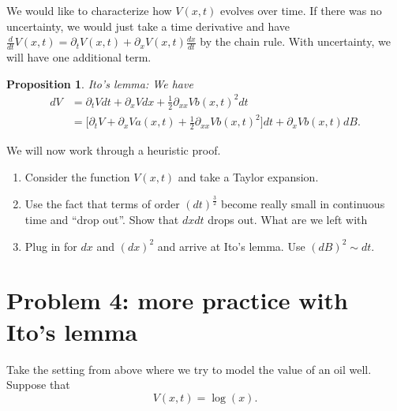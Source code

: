 \documentclass[11pt]{extarticle}
\theoremstyle{plain}
\newtheorem{prop}[thm]{Proposition}
\theoremstyle{definition}
\begin{document}
We would like to characterize how $V(x, t)$ evolves over time. If there was no uncertainty, we would just take a time derivative and have $\frac{d}{dt} V(x, t) = \partial_t V(x, t) + \partial_x V(x, t) \frac{dx}{dt}$ by the chain rule. With uncertainty, we will have one additional term. 

\begin{prop}
	Ito's lemma: We have 
	\begin{align*}
		dV &= \partial_t V dt + \partial_x V dx + \frac{1}{2} \partial_{xx} V b(x, t)^2 dt \\
		&= \bigg[ \partial_t V + \partial_x V a(x, t) + \frac{1}{2} \partial_{xx} V b(x, t)^2\bigg] dt + \partial_x V b(x, t) dB.
	\end{align*}
\end{prop}

\vspace{5mm}
\noindent
We will now work through a heuristic proof.
\begin{enumerate}
\item Consider the function $V(x, t)$ and take a Taylor expansion.

\item Use the fact that terms of order $(dt)^\frac{3}{2}$ become really small in continuous time and ``drop out''. Show that $dx dt$ drops out. What are we left with

\item Plug in for $dx$ and $(dx)^2$ and arrive at Ito's lemma. Use $(dB)^2 \sim dt$.

\end{enumerate}




\vspace{10mm}
\section*{Problem 4: more practice with Ito's lemma}

Take the setting from above where we try to model the value of an oil well. Suppose that 
\begin{equation*}
	V(x, t) = \log(x).
\end{equation*}
\end{document}
